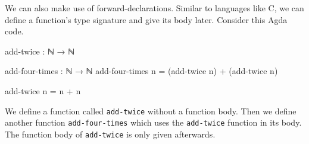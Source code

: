 We can also make use of forward-declarations. Similar to languages like C, we can define a
function's type signature and give its body later. Consider this Agda code.
\begin{code}
  add-twice : ℕ → ℕ
  
  add-four-times : ℕ → ℕ
  add-four-times n = (add-twice n) + (add-twice n)

  add-twice n = n + n
\end{code}
We define a function called \texttt{add-twice} without a function body. Then we define another
function \texttt{add-four-times} which uses the \texttt{add-twice} function in its body. The
function body of \texttt{add-twice} is only given afterwards.
